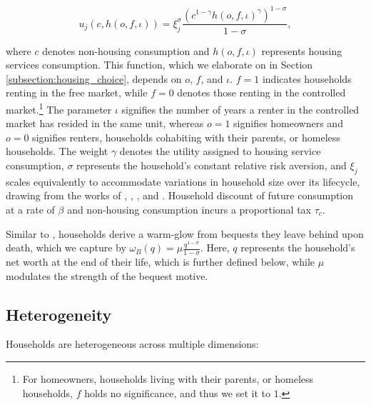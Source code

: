 \documentclass[parskip=full]{article}
\begin{document}
\begin{equation*}
    u_{j}(c,h(o,f,\iota))=\xi_{j}^{\sigma}\frac{\left(c^{1-\gamma} h(o,f,\iota)^{\gamma}\right)^{1-\sigma}}{1-\sigma},
\end{equation*}

\noindent where $c$ denotes non-housing consumption and $h(o,f,\iota)$ represents housing services consumption. This function, which we elaborate on in Section \ref{subsection:housing_choice}, depends on $o$, $f$, and $\iota$. $f=1$ indicates households renting in the free market, while $f=0$ denotes those renting in the controlled market.\footnote{For homeowners, households living with their parents, or homeless households, $f$ holds no significance, and thus we set it to $1$.} The parameter $\iota$ signifies the number of years a renter in the controlled market has resided in the same unit, whereas $o=1$ signifies homeowners and $o=0$ signifies renters, households cohabiting with their parents, or homeless households. The weight $\gamma$ denotes the utility assigned to housing service consumption, $\sigma$ represents the household's constant relative risk aversion, and $\xi_{j}$ scales equivalently to accommodate variations in household size over its lifecycle, drawing from the works of \citet{lm-1980}, \citet{wz-2010}, \citet{xu-2013}, and \citet{rs-2023}. Household discount of future consumption at a rate of $\beta$ and non-housing consumption incurs a proportional tax $\tau_{c}$.

Similar to \citet{cagetti-denardi-2006}, households derive a warm-glow from bequests they leave behind upon death, which we capture by $\omega_{B}(q)=\mu \frac{q^{1-\sigma}}{1-\sigma}$. Here, $q$ represents the household's net worth at the end of their life, which is further defined below, while $\mu$ modulates the strength of the bequest motive.

\subsection{Heterogeneity}

Households are heterogeneous across multiple dimensions:
\end{document}
